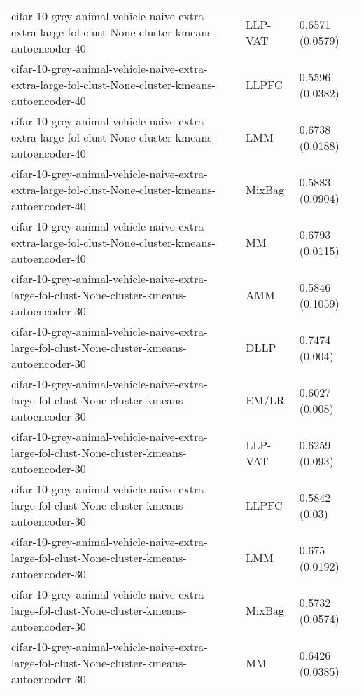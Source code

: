\begin{longtable}{lll}
            cifar-10-grey-animal-vehicle-naive-extra-extra-large-fol-clust-None-cluster-kmeans-autoencoder-40 &   LLP-VAT &                       0.6571 (0.0579) \\
            cifar-10-grey-animal-vehicle-naive-extra-extra-large-fol-clust-None-cluster-kmeans-autoencoder-40 &     LLPFC &                       0.5596 (0.0382) \\
            cifar-10-grey-animal-vehicle-naive-extra-extra-large-fol-clust-None-cluster-kmeans-autoencoder-40 &       LMM &                       0.6738 (0.0188) \\
            cifar-10-grey-animal-vehicle-naive-extra-extra-large-fol-clust-None-cluster-kmeans-autoencoder-40 &    MixBag &                       0.5883 (0.0904) \\
            cifar-10-grey-animal-vehicle-naive-extra-extra-large-fol-clust-None-cluster-kmeans-autoencoder-40 &        MM &                       0.6793 (0.0115) \\
                  cifar-10-grey-animal-vehicle-naive-extra-large-fol-clust-None-cluster-kmeans-autoencoder-30 &       AMM &                       0.5846 (0.1059) \\
                  cifar-10-grey-animal-vehicle-naive-extra-large-fol-clust-None-cluster-kmeans-autoencoder-30 &      DLLP &                        0.7474 (0.004) \\
                  cifar-10-grey-animal-vehicle-naive-extra-large-fol-clust-None-cluster-kmeans-autoencoder-30 &     EM/LR &                        0.6027 (0.008) \\
                  cifar-10-grey-animal-vehicle-naive-extra-large-fol-clust-None-cluster-kmeans-autoencoder-30 &   LLP-VAT &                        0.6259 (0.093) \\
                  cifar-10-grey-animal-vehicle-naive-extra-large-fol-clust-None-cluster-kmeans-autoencoder-30 &     LLPFC &                         0.5842 (0.03) \\
                  cifar-10-grey-animal-vehicle-naive-extra-large-fol-clust-None-cluster-kmeans-autoencoder-30 &       LMM &                        0.675 (0.0192) \\
                  cifar-10-grey-animal-vehicle-naive-extra-large-fol-clust-None-cluster-kmeans-autoencoder-30 &    MixBag &                       0.5732 (0.0574) \\
                  cifar-10-grey-animal-vehicle-naive-extra-large-fol-clust-None-cluster-kmeans-autoencoder-30 &        MM &                       0.6426 (0.0385) \\

\end{longtable}
